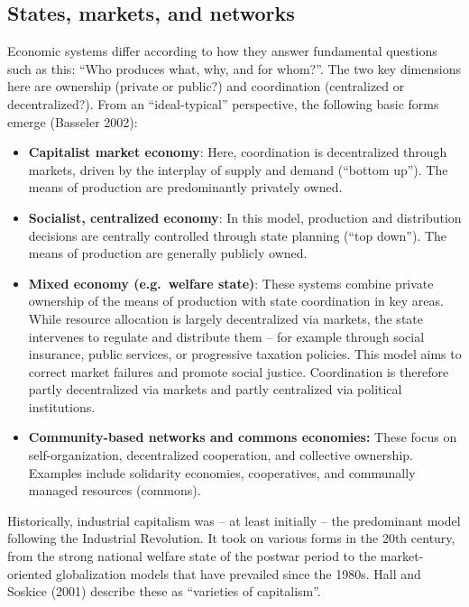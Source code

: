 \documentclass[
  a4paper,
  DIV=11,
  numbers=noendperiod,
  oneside,
  openany]{scrreprt}
\begin{document}
\subsection{States, markets, and
networks}\label{states-markets-and-networks}

Economic systems differ according to how they answer fundamental
questions such as this: ``Who produces what, why, and for whom?''. The
two key dimensions here are ownership (private or public?) and
coordination (centralized or decentralized?). From an ``ideal-typical''
perspective, the following basic forms emerge (Basseler 2002):

\begin{itemize}
\item
  \textbf{Capitalist market economy}: Here, coordination is
  decentralized through markets, driven by the interplay of supply and
  demand (``bottom up''). The means of production are predominantly
  privately owned.
\item
  \textbf{Socialist, centralized economy}: In this model, production and
  distribution decisions are centrally controlled through state planning
  (``top down''). The means of production are generally publicly owned.
\item
  \textbf{Mixed economy (e.g.~welfare state)}: These systems combine
  private ownership of the means of production with state coordination
  in key areas. While resource allocation is largely decentralized via
  markets, the state intervenes to regulate and distribute them -- for
  example through social insurance, public services, or progressive
  taxation policies. This model aims to correct market failures and
  promote social justice. Coordination is therefore partly decentralized
  via markets and partly centralized via political institutions.
\item
  \textbf{Community-based networks and commons economies:} These focus
  on self-organization, decentralized cooperation, and collective
  ownership. Examples include solidarity economies, cooperatives, and
  communally managed resources (commons).
\end{itemize}

Historically, industrial capitalism was -- at least initially -- the
predominant model following the Industrial Revolution. It took on
various forms in the 20th century, from the strong national welfare
state of the postwar period to the market-oriented globalization models
that have prevailed since the 1980s. Hall and Soskice (2001) describe
these as ``varieties of capitalism''.
\end{document}
